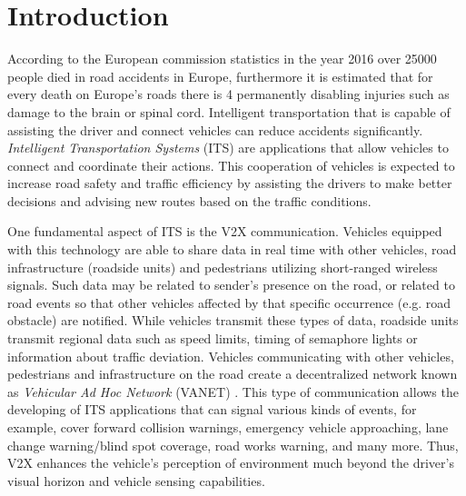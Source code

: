 
\chapter{Introduction}
\label{prob}

According to the European commission statistics \cite{death_road} in the year 2016 over 25000 people died in road accidents in Europe, furthermore it is estimated that for every death on Europe's roads there is 4 permanently disabling injuries such as damage to the brain or spinal cord. Intelligent transportation that is capable of assisting the driver and connect vehicles can reduce accidents significantly. \textit{Intelligent Transportation Systems} (ITS) \cite{its} are applications that allow vehicles to connect and coordinate their actions. This cooperation of vehicles is expected to increase road safety and traffic efficiency by assisting the drivers to make better decisions and advising new routes based on the traffic conditions.

One fundamental aspect of ITS is the V2X communication. Vehicles equipped with this technology are able to share data in real time with other vehicles, road infrastructure (roadside units) and pedestrians utilizing short-ranged wireless signals. Such data may be related to sender's presence on the road, or related to road events so that other vehicles affected by that specific occurrence (e.g. road obstacle) are notified. While vehicles transmit these types of data, roadside units transmit regional data such as speed limits, timing of semaphore lights or information about traffic deviation. Vehicles communicating with other vehicles, pedestrians and infrastructure on the road create a decentralized network known as \textit{Vehicular Ad Hoc Network} (VANET) \cite{vanet_ETSI} \cite{vanet_IEEE}. This type of communication allows the developing of ITS applications that can signal various kinds of events, for example, cover forward collision warnings, emergency vehicle approaching, lane change warning\slash blind spot coverage, road works warning, and many more. Thus, V2X enhances the vehicle's perception of environment much beyond the driver's visual horizon and vehicle sensing capabilities.

